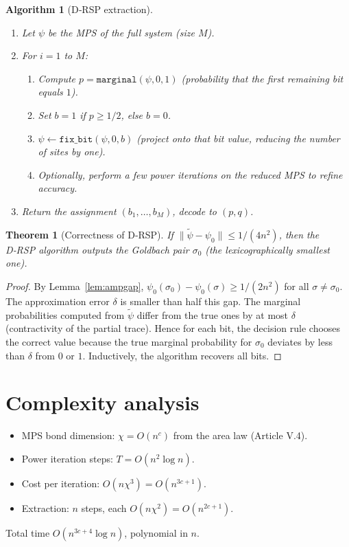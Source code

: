 \documentclass[11pt,a4paper]{article}
\newtheorem{theorem}{Theorem}[section]
\newtheorem{algorithm}{Algorithm}[section]
\begin{document}
\begin{algorithm}[D‑RSP extraction]\label{alg:drsp}
\begin{enumerate}
\item Let $\psi$ be the MPS of the full system (size $M$).
\item For $i = 1$ to $M$:
   \begin{enumerate}
   \item Compute $p = \texttt{marginal}(\psi, 0, 1)$ (probability that the first remaining bit equals $1$).
   \item Set $b = 1$ if $p \ge 1/2$, else $b = 0$.
   \item $\psi \leftarrow \texttt{fix\_bit}(\psi, 0, b)$ (project onto that bit value, reducing the number of sites by one).
   \item Optionally, perform a few power iterations on the reduced MPS to refine accuracy.
   \end{enumerate}
\item Return the assignment $(b_1,\dots,b_M)$, decode to $(p,q)$.
\end{enumerate}
\end{algorithm}

\begin{theorem}[Correctness of D‑RSP]\label{thm:drsp}
If $\|\tilde{\psi} - \psi_0\| \le 1/(4n^2)$, then the D‑RSP algorithm outputs the Goldbach pair $\sigma_0$ (the lexicographically smallest one).
\end{theorem}
\begin{proof}
By Lemma~\ref{lem:ampgap}, $\psi_0(\sigma_0) - \psi_0(\sigma) \ge 1/(2n^2)$ for all $\sigma \neq \sigma_0$. The approximation error $\delta$ is smaller than half this gap. The marginal probabilities computed from $\tilde{\psi}$ differ from the true ones by at most $\delta$ (contractivity of the partial trace). Hence for each bit, the decision rule chooses the correct value because the true marginal probability for $\sigma_0$ deviates by less than $\delta$ from $0$ or $1$. Inductively, the algorithm recovers all bits.
\end{proof}

\section{Complexity analysis}

\begin{itemize}
\item MPS bond dimension: $\chi = O(n^c)$ from the area law (Article V.4).
\item Power iteration steps: $T = O(n^2 \log n)$.
\item Cost per iteration: $O(n\chi^3) = O(n^{3c+1})$.
\item Extraction: $n$ steps, each $O(n\chi^2) = O(n^{2c+1})$.
\end{itemize}
Total time $O(n^{3c+4}\log n)$, polynomial in $n$.
\end{document}
